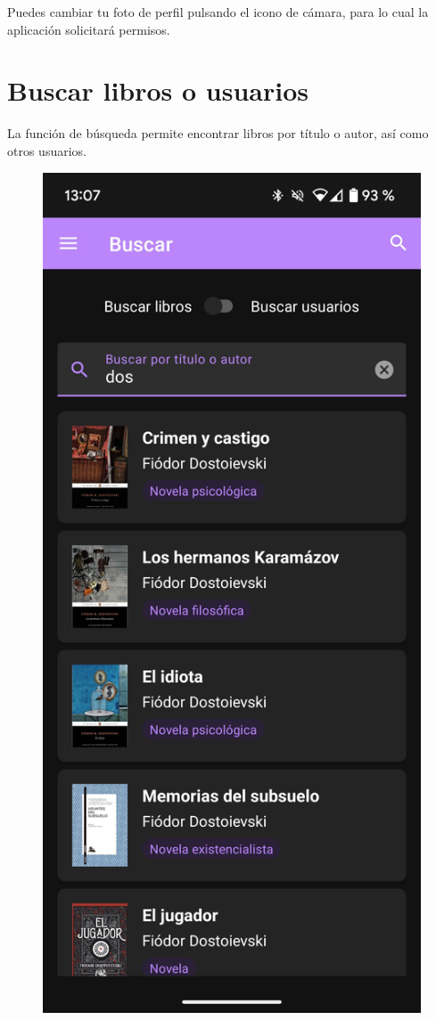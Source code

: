 \documentclass[a4paper,12pt]{report}
\begin{document}
\begin{multicols}{2}
        Puedes cambiar tu foto de perfil pulsando el icono de cámara, para lo cual la aplicación solicitará permisos.
        
        \columnbreak
        
        \section{Buscar libros o usuarios}
        \vspace{-0.8em}  %
        La función de búsqueda permite encontrar libros por título o autor, así como otros usuarios.
        
        \begin{figure}[H]
          \centering
          \includegraphics[width=0.47\linewidth]{.img/buscador-libros.png}\hfill

\end{figure}
\end{multicols}
\end{document}
